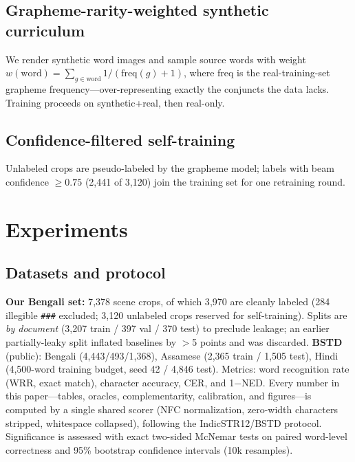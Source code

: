 \documentclass[iicol,pdflatex,sn-mathphys-num]{sn-jnl}
\begin{document}
\subsection{Grapheme-rarity-weighted synthetic curriculum}
We render synthetic word images and sample source words with weight
$w(\mathrm{word})=\sum_{g\in \mathrm{word}} 1/(\mathrm{freq}(g)+1)$, where
freq is the real-training-set grapheme frequency---over-representing exactly
the conjuncts the data lacks. Training proceeds on synthetic+real, then
real-only.

\subsection{Confidence-filtered self-training}
Unlabeled crops are pseudo-labeled by the grapheme model; labels with beam
confidence $\geq 0.75$ (2{,}441 of 3{,}120) join the training set for one
retraining round.

\section{Experiments}\label{sec:exp}
\subsection{Datasets and protocol}
\textbf{Our Bengali set:} 7{,}378 scene crops, of which 3{,}970 are cleanly
labeled (284 illegible \texttt{\#\#\#} excluded; 3{,}120 unlabeled crops
reserved for self-training). Splits are \emph{by document} (3{,}207 train /
397 val / 370 test) to preclude leakage; an earlier partially-leaky split
inflated baselines by $>$5 points and was discarded.
\textbf{BSTD}~\cite{bstd} (public): Bengali (4{,}443/493/1{,}368), Assamese
(2{,}365 train / 1{,}505 test), Hindi (4{,}500-word training budget,
seed 42 / 4{,}846 test). Metrics: word recognition rate (WRR, exact match),
character accuracy, CER, and 1$-$NED. Every number in this paper---tables,
oracles, complementarity, calibration, and figures---is computed by a
single shared scorer (NFC normalization, zero-width characters stripped,
whitespace collapsed), following the IndicSTR12/BSTD protocol. Significance
is assessed with exact two-sided McNemar tests on paired word-level
correctness and 95\% bootstrap confidence intervals (10k resamples).
\end{document}
